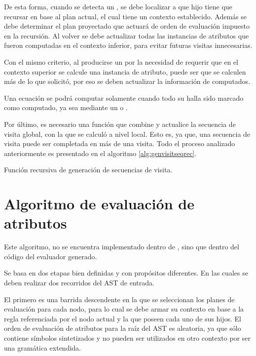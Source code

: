 De esta forma, cuando se detecta un , se debe localizar a que hijo tiene que recursar en base al plan actual, el cual tiene un contexto establecido. Además se debe determinar el plan proyectado que actuará de orden de evaluación impuesto en la recursión. Al volver se debe actualizar todas las instancias de atributos que fueron computadas en el contexto inferior, para evitar futuras visitas innecesarias.

Con el mismo criterio, al producirse un  por la necesidad de requerir que en el contexto superior se calcule una instancia de atributo, puede ser que se calculen más de lo que solicitó, por eso se deben actualizar la información de computados.

Una ecuación se podrá computar solamente cuando todo su  halla sido marcado como computado, ya sea mediante un  o .

Por último, es necesario una función que combine y actualice la secuencia de visita global, con la que se calculó a nivel local. Esto es, ya que, una secuencia de visita puede ser completada en más de una visita. Todo el proceso analizado anteriormente es presentado en el algoritmo \ref{alg:genvisitseqrec}.

\begin{algorithm}[!ht]

\vspace{-0.5cm}
\caption{\label{alg:genvisitseqrec}Función recursiva de generación de secuencias de visita.}
\end{algorithm}

\section{Algoritmo de evaluación de atributos}
\label{sec:algevalattr}

Este algoritmo, no se encuentra implementado dentro de \maggen, sino que dentro del código del evaluador generado.

Se basa en dos etapas bien definidas y con propósitos diferentes. En las cuales se deben realizar dos recorridos del AST de entrada.

El primero es una barrida descendente en la que se seleccionan los planes de evaluación para cada nodo, para lo cual se debe armar su contexto en base a la regla referenciada por el nodo actual y la que poseen cada uno de sus hijos. El orden de evaluación de atributos para la raíz del AST es aleatoria, ya que sólo contiene símbolos sintetizados y no pueden ser utilizados en otro contexto por ser una gramática extendida.

